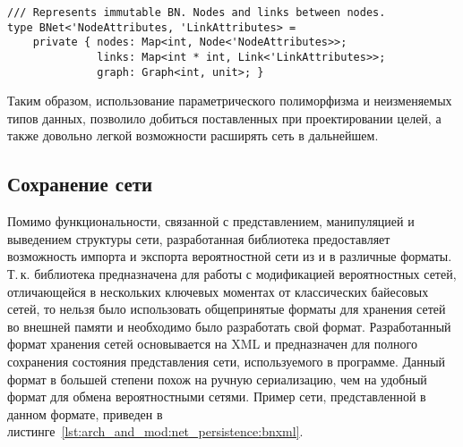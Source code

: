 \begin{lstlisting}[style=fsharpstyle,caption={Определение структуры данных для вероятностной сети}, label=lst:arch_and_mod:probab_net:bnet_definition]
/// Represents immutable BN. Nodes and links between nodes.
type BNet<'NodeAttributes, 'LinkAttributes> =
    private { nodes: Map<int, Node<'NodeAttributes>>;
              links: Map<int * int, Link<'LinkAttributes>>;
              graph: Graph<int, unit>; }
\end{lstlisting}

Таким образом, использование параметрического полиморфизма и не\-изменяемых типов данных, позволило добиться поставленных при проектировании целей, а также довольно легкой возможности расширять сеть в дальнейшем.

\subsection{Сохранение сети} %
\label{sub:arch_and_mod:net_persistence}

Помимо функциональности, связанной с представлением, манипуляцией и выведением структуры сети, разработанная библиотека предоставляет возможность импорта и экспорта вероятностной сети из и в различные форматы.
Т.\,к. библиотека предназначена для работы с модификацией вероятностных сетей, отличающейся в нескольких ключевых моментах от классических байесовых сетей, то нельзя было использовать общепринятые форматы для хранения сетей во внешней памяти и необходимо было разработать свой формат.
Разработанный формат хранения сетей основывается на XML и предназначен для полного сохранения состояния представления сети, используемого в программе.
Данный формат в большей степени похож на ручную сериализацию, чем на удобный формат для обмена вероятностными сетями.
Пример сети, представленной в данном формате, приведен в листинге~\ref{lst:arch_and_mod:net_persistence:bnxml}.

